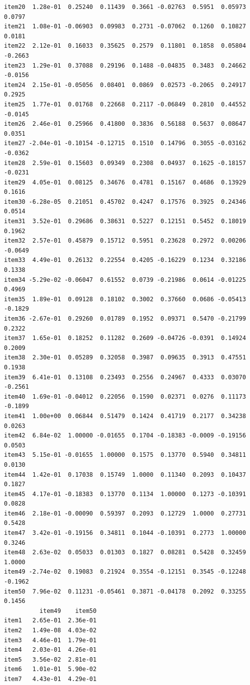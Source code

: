 \documentclass[
  a4paper,
]{ltjsbook}
\begin{document}
\begin{verbatim}
item20  1.28e-01  0.25240  0.11439  0.3661 -0.02763  0.5951  0.05973  0.0797
item21  1.08e-01 -0.06903  0.09983  0.2731 -0.07062  0.1260  0.10827  0.0181
item22  2.12e-01  0.16033  0.35625  0.2579  0.11801  0.1858  0.05804 -0.2663
item23  1.29e-01  0.37088  0.29196  0.1488 -0.04835  0.3483  0.24662 -0.0156
item24  2.15e-01 -0.05056  0.08401  0.0869  0.02573 -0.2065  0.24917  0.2925
item25  1.77e-01  0.01768  0.22668  0.2117 -0.06849  0.2810  0.44552 -0.0145
item26  2.46e-01  0.25966  0.41800  0.3836  0.56188  0.5637  0.08647  0.0351
item27 -2.04e-01 -0.10154 -0.12715  0.1510  0.14796  0.3055 -0.03162 -0.0362
item28  2.59e-01  0.15603  0.09349  0.2308  0.04937  0.1625 -0.18157 -0.0231
item29  4.05e-01  0.08125  0.34676  0.4781  0.15167  0.4686  0.13929  0.1616
item30 -6.28e-05  0.21051  0.45702  0.4247  0.17576  0.3925  0.24346  0.0514
item31  3.52e-01  0.29686  0.38631  0.5227  0.12151  0.5452  0.18019  0.1962
item32  2.57e-01  0.45879  0.15712  0.5951  0.23628  0.2972  0.00206 -0.0649
item33  4.49e-01  0.26132  0.22554  0.4205 -0.16229  0.1234  0.32186  0.1338
item34 -5.29e-02 -0.06047  0.61552  0.0739 -0.21986  0.0614 -0.01225  0.4969
item35  1.89e-01  0.09128  0.18102  0.3002  0.37660  0.0686 -0.05413 -0.1829
item36 -2.67e-01  0.29260  0.01789  0.1952  0.09371  0.5470 -0.21799  0.2322
item37  1.65e-01  0.18252  0.11282  0.2609 -0.04726 -0.0391  0.14924  0.2009
item38  2.30e-01  0.05289  0.32058  0.3987  0.09635  0.3913  0.47551  0.1938
item39  6.41e-01  0.13108  0.23493  0.2556  0.24967  0.4333  0.03070 -0.2561
item40  1.69e-01 -0.04012  0.22056  0.1590  0.02371  0.0276  0.11173 -0.1899
item41  1.00e+00  0.06844  0.51479  0.1424  0.41719  0.2177  0.34238  0.0263
item42  6.84e-02  1.00000 -0.01655  0.1704 -0.18383 -0.0009 -0.19156  0.0503
item43  5.15e-01 -0.01655  1.00000  0.1575  0.13770  0.5940  0.34811  0.0130
item44  1.42e-01  0.17038  0.15749  1.0000  0.11340  0.2093  0.10437  0.1827
item45  4.17e-01 -0.18383  0.13770  0.1134  1.00000  0.1273 -0.10391  0.0828
item46  2.18e-01 -0.00090  0.59397  0.2093  0.12729  1.0000  0.27731  0.5428
item47  3.42e-01 -0.19156  0.34811  0.1044 -0.10391  0.2773  1.00000  0.3246
item48  2.63e-02  0.05033  0.01303  0.1827  0.08281  0.5428  0.32459  1.0000
item49 -2.74e-02  0.19083  0.21924  0.3554 -0.12151  0.3545 -0.12248 -0.1962
item50  7.96e-02  0.11231 -0.05461  0.3871 -0.04178  0.2092  0.33255  0.1456
          item49    item50
item1   2.65e-01  2.36e-01
item2   1.49e-08  4.03e-02
item3   4.46e-01  1.79e-01
item4   2.03e-01  4.26e-01
item5   3.56e-02  2.81e-01
item6   1.01e-01  5.90e-02
item7   4.43e-01  4.29e-01

\end{verbatim}
\end{document}
